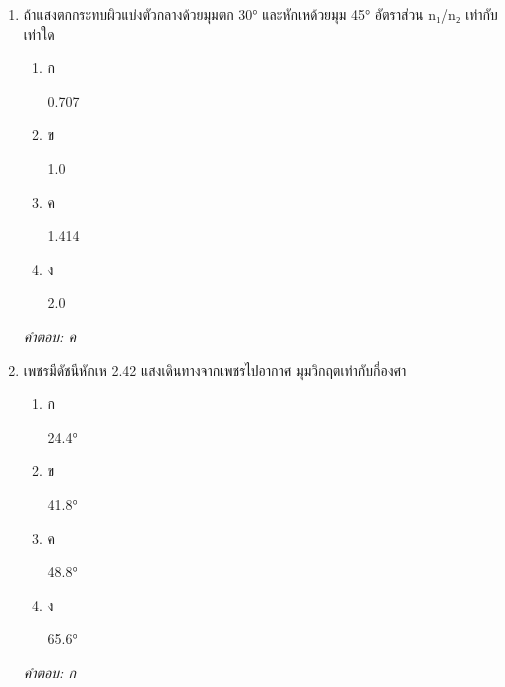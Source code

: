 \documentclass[12pt]{article}
\begin{document}
\begin{enumerate}[label=\arabic*., itemsep=0.5\baselineskip, topsep=0.5\baselineskip, leftmargin=*]
\item ถ้าแสงตกกระทบผิวแบ่งตัวกลางด้วยมุมตก 30° และหักเหด้วยมุม 45° อัตราส่วน n₁/n₂ เท่ากับเท่าใด
\begin{enumerate}[label=\alph*)., itemsep=0.3\baselineskip, topsep=0.3\baselineskip]
\item ก\ 
\begin{minipage}[t]{0.9\linewidth}
\raggedright 0.707
\end{minipage}
\item ข\ 
\begin{minipage}[t]{0.9\linewidth}
\raggedright 1.0
\end{minipage}
\item ค\ 
\begin{minipage}[t]{0.9\linewidth}
\raggedright 1.414
\end{minipage}
\item ง\ 
\begin{minipage}[t]{0.9\linewidth}
\raggedright 2.0
\end{minipage}
\end{enumerate}
\vspace{-0.3\baselineskip}
\begin{small}
\textit{คำตอบ: ค}
\end{small}

\item เพชรมีดัชนีหักเห 2.42 แสงเดินทางจากเพชรไปอากาศ มุมวิกฤตเท่ากับกี่องศา
\begin{enumerate}[label=\alph*)., itemsep=0.3\baselineskip, topsep=0.3\baselineskip]
\item ก\ 
\begin{minipage}[t]{0.9\linewidth}
\raggedright 24.4°
\end{minipage}
\item ข\ 
\begin{minipage}[t]{0.9\linewidth}
\raggedright 41.8°
\end{minipage}
\item ค\ 
\begin{minipage}[t]{0.9\linewidth}
\raggedright 48.8°
\end{minipage}
\item ง\ 
\begin{minipage}[t]{0.9\linewidth}
\raggedright 65.6°
\end{minipage}
\end{enumerate}
\vspace{-0.3\baselineskip}
\begin{small}
\textit{คำตอบ: ก}
\end{small}


\end{enumerate}
\end{document}
